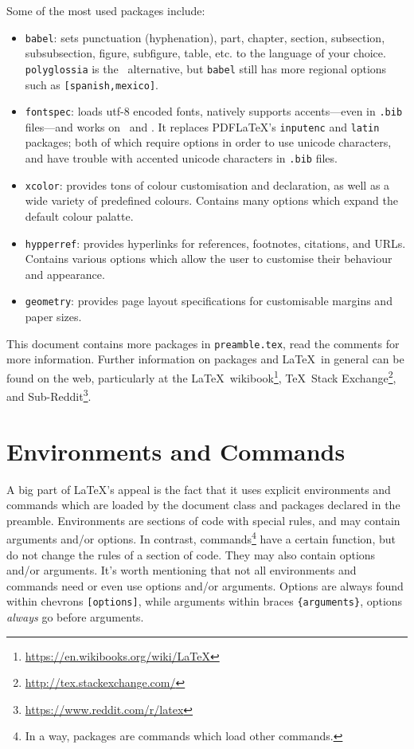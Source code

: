 Some of the most used packages include:
\begin{itemize}
\item \verb|babel|: sets punctuation (hyphenation), part, chapter,
  section, subsection, subsubsection, figure, subfigure, table,
  etc. to the language of your choice.  \verb|polyglossia| is the
  \XeLaTeX~alternative, but \verb|babel| still has more regional
  options such as \verb|[spanish,mexico]|.
\item \verb|fontspec|: loads utf-8 encoded fonts, natively supports
  accents---even in \texttt{.bib} files---and works on \XeLaTeX~and
  \LuaTeX.  It replaces PDF\LaTeX's \verb|inputenc| and \verb|latin|
  packages; both of which require options in order to use unicode
  characters, and have trouble with accented unicode characters in
  \texttt{.bib} files.
\item \verb|xcolor|: provides tons of colour customisation and
  declaration, as well as a wide variety of predefined
  colours.  Contains many options which expand the default colour
  palatte.
\item \verb|hypperref|: provides hyperlinks for references, footnotes,
  citations, and URLs.  Contains various options which allow the user
  to customise their behaviour and appearance.
\item \verb|geometry|: provides page layout specifications for
  customisable margins and paper sizes.
\end{itemize}
This document contains more packages in \texttt{preamble.tex}, read
the comments for more information.  Further information on packages
and \LaTeX~in general can be found on the web, particularly at the
\LaTeX~wikibook\footnote{\url{https://en.wikibooks.org/wiki/LaTeX}},
\TeX~Stack Exchange\footnote{\url{http://tex.stackexchange.com/}}, and
Sub-Reddit\footnote{\url{https://www.reddit.com/r/latex}}.
%
\section{Environments and Commands}\label{s:ec}
%
A big part of \LaTeX's appeal is the fact that it uses explicit
environments and commands which are loaded by the document class and
packages declared in the preamble.  Environments are sections of code
with special rules, and may contain arguments and/or options.  In
contrast, commands\footnote{In a way, packages are commands which load
  other commands.} have a certain function, but do not change the
rules of a section of code.  They may also contain options and/or
arguments.  It's worth mentioning that not all environments and
commands need or even use options and/or arguments.  Options are
always found within chevrons \verb|[options]|, while arguments within
braces \verb|{arguments}|, options \emph{always} go before arguments.

